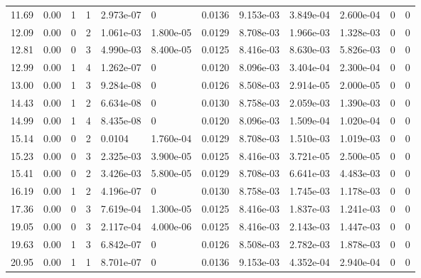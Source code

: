 \documentclass[preview]{standalone}
\begin{document}
{{\begin{tabular}{L{1.2cm}C{1.2cm} C{0.3cm}C{0.5cm} C{1.4cm}C{1.4cm} C{1.4cm}C{1.4cm} C{1.6cm}C{1.6cm} C{1.6cm}C{1.6cm}}
  11.69  &  0.00  & 1     &  1 &  2.973e-07  & 0  &  0.0136&   9.153e-03& 3.849e-04 & 2.600e-04   &  0 & 0  \\ 
  12.09  &  0.00  & 0     &  2 &  1.061e-03  & 1.800e-05  &  0.0129&   8.708e-03& 1.966e-03 & 1.328e-03   &  0 & 0  \\ 
  12.81  &  0.00  & 0     &  3 &  4.990e-03  & 8.400e-05  &  0.0125&   8.416e-03& 8.630e-03 & 5.826e-03   &  0 & 0  \\ 
  12.99  &  0.00  & 1     &  4 &  1.262e-07  & 0  &  0.0120&   8.096e-03& 3.404e-04 & 2.300e-04   &  0 & 0  \\ 
  13.00  &  0.00  & 1     &  3 &  9.284e-08  & 0  &  0.0126&   8.508e-03& 2.914e-05 & 2.000e-05   &  0 & 0  \\ 
  14.43  &  0.00  & 1     &  2 &  6.634e-08  & 0  &  0.0130&   8.758e-03& 2.059e-03 & 1.390e-03   &  0 & 0  \\ 
  14.99  &  0.00  & 1     &  4 &  8.435e-08  & 0  &  0.0120&   8.096e-03& 1.509e-04 & 1.020e-04   &  0 & 0  \\ 
  15.14  &  0.00  & 0     &  2 &  0.0104  & 1.760e-04  &  0.0129&   8.708e-03& 1.510e-03 & 1.019e-03   &  0 & 0  \\ 
  15.23  &  0.00  & 0     &  3 &  2.325e-03  & 3.900e-05  &  0.0125&   8.416e-03& 3.721e-05 & 2.500e-05   &  0 & 0  \\ 
  15.41  &  0.00  & 0     &  2 &  3.426e-03  & 5.800e-05  &  0.0129&   8.708e-03& 6.641e-03 & 4.483e-03   &  0 & 0  \\ 
  16.19  &  0.00  & 1     &  2 &  4.196e-07  & 0  &  0.0130&   8.758e-03& 1.745e-03 & 1.178e-03   &  0 & 0  \\ 
  17.36  &  0.00  & 0     &  3 &  7.619e-04  & 1.300e-05  &  0.0125&   8.416e-03& 1.837e-03 & 1.241e-03   &  0 & 0  \\ 
  19.05  &  0.00  & 0     &  3 &  2.117e-04  & 4.000e-06  &  0.0125&   8.416e-03& 2.143e-03 & 1.447e-03   &  0 & 0  \\ 
  19.63  &  0.00  & 1     &  3 &  6.842e-07  & 0  &  0.0126&   8.508e-03& 2.782e-03 & 1.878e-03   &  0 & 0  \\ 
  20.95  &  0.00  & 1     &  1 &  8.701e-07  & 0  &  0.0136&   9.153e-03& 4.352e-04 & 2.940e-04   &  0 & 0  \\ 
\hline 
\end{tabular} 

}}
\end{document}
